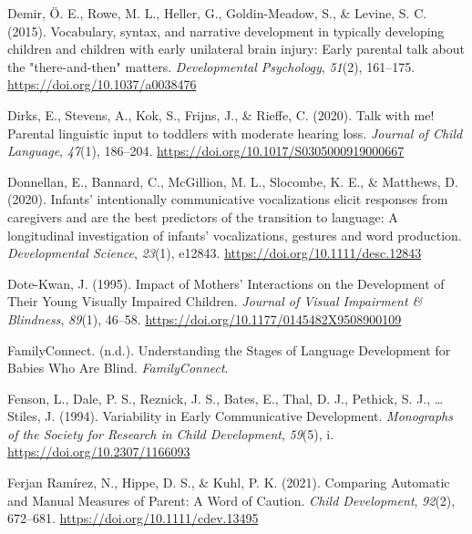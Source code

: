 \documentclass[
  man,floatsintext]{apa6}
\newlength{\cslhangindent}
\newlength{\cslentryspacingunit} %
\newenvironment{CSLReferences}[2] %
 {%
  \setlength{\parindent}{0pt}
  \ifodd #1
  \let\oldpar\par
  \def\par{\hangindent=\cslhangindent\oldpar}
  \fi
  \setlength{\parskip}{#2\cslentryspacingunit}
 }%
 {}
\begin{document}
\begin{CSLReferences}{1}{0}
\leavevmode{}%
Demir, Ö. E., Rowe, M. L., Heller, G., Goldin-Meadow, S., \& Levine, S. C. (2015). Vocabulary, syntax, and narrative development in typically developing children and children with early unilateral brain injury: Early parental talk about the "there-and-then" matters. \emph{Developmental Psychology}, \emph{51}(2), 161--175. \url{https://doi.org/10.1037/a0038476}

\leavevmode{}%
Dirks, E., Stevens, A., Kok, S., Frijns, J., \& Rieffe, C. (2020). Talk with me! {Parental} linguistic input to toddlers with moderate hearing loss. \emph{Journal of Child Language}, \emph{47}(1), 186--204. \url{https://doi.org/10.1017/S0305000919000667}

\leavevmode{}%
Donnellan, E., Bannard, C., McGillion, M. L., Slocombe, K. E., \& Matthews, D. (2020). Infants' intentionally communicative vocalizations elicit responses from caregivers and are the best predictors of the transition to language: {A} longitudinal investigation of infants' vocalizations, gestures and word production. \emph{Developmental Science}, \emph{23}(1), e12843. \url{https://doi.org/10.1111/desc.12843}

\leavevmode{}%
Dote-Kwan, J. (1995). Impact of {Mothers}' {Interactions} on the {Development} of {Their Young Visually Impaired Children}. \emph{Journal of Visual Impairment \& Blindness}, \emph{89}(1), 46--58. \url{https://doi.org/10.1177/0145482X9508900109}

\leavevmode{}%
FamilyConnect. (n.d.). Understanding the {Stages} of {Language Development} for {Babies Who Are Blind}. \emph{FamilyConnect}.

\leavevmode{}%
Fenson, L., Dale, P. S., Reznick, J. S., Bates, E., Thal, D. J., Pethick, S. J., \ldots{} Stiles, J. (1994). Variability in {Early Communicative Development}. \emph{Monographs of the Society for Research in Child Development}, \emph{59}(5), i. \url{https://doi.org/10.2307/1166093}

\leavevmode{}%
Ferjan Ramírez, N., Hippe, D. S., \& Kuhl, P. K. (2021). Comparing {Automatic} and {Manual Measures} of {Parent}: {A Word} of {Caution}. \emph{Child Development}, \emph{92}(2), 672--681. \url{https://doi.org/10.1111/cdev.13495}


\end{CSLReferences}
\end{document}
